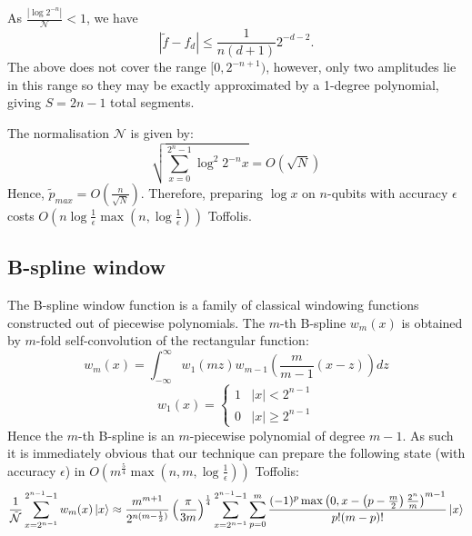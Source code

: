 As $\frac{|\log 2^{-n}|}{\mathcal{N}} < 1$, we have
\begin{equation}
    |\tilde f - f_{d}| \leq  \frac{1}{n(d+1)} 2^{-d-2}.
\end{equation}
The above does not cover the range $[0, 2^{-n+1})$, however, only two amplitudes lie in this range so they may be exactly approximated by a 1-degree polynomial, giving $S=2n-1$ total segments.

The normalisation $\mathcal{N}$ is given by:
\begin{equation}
    \sqrt{\sum_{x=0}^{2^n-1}\log^2 2^{-n} x} = O\left(\sqrt{N}\right)
\end{equation}
Hence, $\tilde{p}_{max} = O\left(\frac{n}{\sqrt{N}}\right)$. Therefore, preparing $\log{x}$ on $n$-qubits with accuracy $\epsilon$ costs $O(n \log \frac{1}{\epsilon}\max(n, \log\frac{1}{\epsilon}))$ Toffolis. 

\subsection{B-spline window}
\label{section:b_spline}
  The B-spline window function \cite{bspline} is a family of classical windowing functions constructed out of piecewise polynomials. The $m$-th B-spline $w_m(x)$ is obtained by $m$-fold self-convolution of the rectangular function:
  \begin{equation}
  \label{eq:self_conv}
      w_m(x) = \int_{-\infty}^{\infty} w_1(m z) w_{m-1}\left(\frac{m}{m-1}(x-z)\right) dz
  \end{equation}
  \begin{equation}
      w_1(x) = \begin{cases}
          1 & |x| < 2^{n-1}\\
          0 & |x| \geq 2^{n-1}
      \end{cases}
  \end{equation}
  Hence the $m$-th B-spline is an $m$-piecewise polynomial of degree $m-1$. As such it is immediately obvious that our technique can prepare the following state (with accuracy $\epsilon$) in $O(m^{\frac{5}{4}}\max(n,m, \log \frac{1}{\epsilon}))$ Toffolis:
  \begin{equation}
      \frac{1}{\mathcal{\tilde N}}\sum_{x=2^{n-1}}^{2^{n-1} -1} w_m(x)\ket{x} \approx \frac{m^{m+1}}{2^{n(m-\frac{1}{2})}}\left(\frac{\pi}{3m}\right)^{\frac{1}{4}}\sum_{x=2^{n-1}}^{2^{n -1}-1}\sum_{p=0}^m  \frac{(-1)^p \max\left(0,x - \left(p-\frac{m}{2}\right)\frac{2^n}{m}\right)^{m-1}}{p!(m-p)!}\ket{x}
  \end{equation}
  
